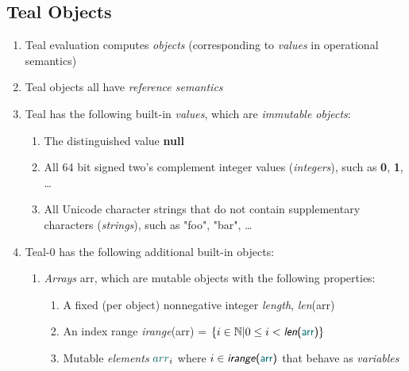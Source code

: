 \documentclass{article}
\newcommand{\Varray}[0]{\textcolor{dcyan}{arr}}
\newcommand{\Vnull}[0]{\textbf{\textcolor{dcyan}{null}}}
\newcommand{\Vint}[1]{{\textsf{\textcolor{dcyan}{\textbf{#1}}}}}
\newcommand{\Vstr}[1]{{\textsf{\textcolor{dcyan}{"#1"}}}}
\newcommand{\arraylength}[1]{\textsf{\textit{len}(#1)}}
\newcommand{\arrayindices}[1]{\textsf{\textit{irange}(#1)}}
\begin{document}
\subsection{Teal Objects}

\begin{enumerate}
\item Teal evaluation computes \emph{objects} (corresponding to \emph{values} in operational semantics)
\item Teal objects all have \emph{reference semantics}
\item Teal has the following built-in \emph{values}, which are \emph{immutable objects}:
  \begin{enumerate}
  \item The distinguished value \Vnull{}
  \item All 64 bit signed two's complement integer values (\emph{integers}), such as \Vint{0}, \Vint{1}, \ldots
  \item All Unicode character strings that do not contain supplementary characters (\emph{strings}), such as \Vstr{foo}, \Vstr{bar}, \ldots
  \end{enumerate}
\item Teal-0 has the following additional built-in objects:
\begin{enumerate}
\item \emph{Arrays} \Varray, which are mutable objects with the following properties:
  \begin{enumerate}
  \item A fixed (per object) nonnegative integer \emph{length}, \arraylength{\Varray}
  \item An index range \arrayindices{\Varray} = $\{i \in \mathbb{N} | 0 \le i < \arraylength{\Varray}\}$
  \item Mutable \emph{elements} $\Varray_i$ where $i \in \arrayindices{\Varray}$ that behave as \emph{variables}
  \end{enumerate}
\end{enumerate}
\end{enumerate}
\end{document}
